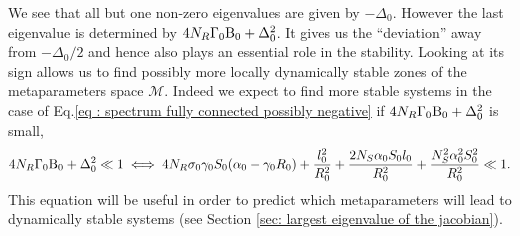 \documentclass[12pt, titlepage]{report}
\begin{document}
	We see that all but one non-zero eigenvalues are given by $-\Delta_0$. However the last eigenvalue is determined by
	$4N_R\Gamma_0\text{B}_0+\Delta_0^2$. It gives us the ``deviation'' away from $-\Delta_0/2$ and hence also plays an essential role in the stability. Looking at its sign allows us to find possibly more locally dynamically stable zones of the metaparameters space $\mathcal{M}$. Indeed we expect to find more stable systems in the case of Eq.\eqref{eq : spectrum fully connected possibly negative} if $4 N_R \Gamma_0 \text{B}_0 + \Delta_0 ^2$ is small, \ie
	\begin{equation}
	4 N_R \Gamma_0 \text{B}_0 + \Delta_0 ^2 \ll 1 \iff 4N_R \sigma_0 \gamma_0 S_0  (\alpha_0 - \gamma_0 R_0) +\frac{l_0^2}{R_0^2}+\frac{2N_S\alpha_0 S_0 l_0}{R_0^2} + \frac{N_S^2 \alpha_0^2 S_0^2}{R_0^2} \ll 1. \label{eq : dynamical stability methods fully connected metaparameters}
	\end{equation}
	This equation will be useful in order to predict which metaparameters will lead to dynamically stable systems (see Section \ref{sec: largest eigenvalue of the jacobian}).
\end{document}
